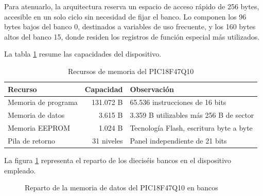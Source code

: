 Para atenuarlo, la arquitectura reserva un espacio de acceso rápido de
256 bytes, accesible en un solo ciclo sin necesidad de fijar el banco. Lo
componen los 96 bytes bajos del banco 0, destinados a variables de uso
frecuente, y los 160 bytes altos del banco 15, donde residen los registros de
función especial más utilizados.

La tabla \ref{tab:memoria47q10} resume las capacidades del dispositivo.

\begin{table}[H]
  \centering
  \caption{Recursos de memoria del PIC18F47Q10 \cite{microchip2024ds40002043}}
  \label{tab:memoria47q10}
  \begin{tabular}{@{}lrl@{}}
    \toprule
    \textbf{Recurso} & \textbf{Capacidad} & \textbf{Observación} \\
    \midrule
    Memoria de programa & 131.072 B & 65.536 instrucciones de 16 bits \\
    Memoria de datos    & 3.615 B   & 3.359 B utilizables más 256 B de sector \\
    Memoria EEPROM      & 1.024 B   & Tecnología Flash, escritura byte a byte \\
    Pila de retorno     & 31 niveles & Panel independiente de 21 bits \\
    \bottomrule
  \end{tabular}
\end{table}

La figura \ref{fig:bancos} representa el reparto de los dieciséis bancos en el
dispositivo empleado.

\begin{figure}[H]
  \centering
  \caption{Reparto de la memoria de datos del PIC18F47Q10 en bancos
           \cite{microchip2024ds40002043}}
  \label{fig:bancos}
\end{figure}

